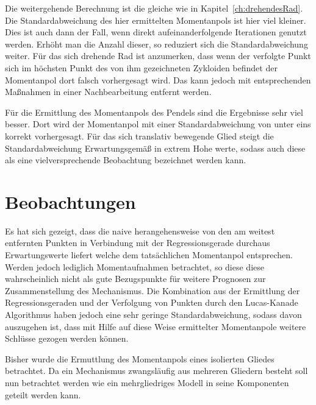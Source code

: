 Die weitergehende Berechnung ist die gleiche wie in Kapitel~\ref{ch:drehendesRad}.
Die Standardabweichung des hier ermittelten Momentanpols ist hier viel kleiner.
Dies ist auch dann der Fall, wenn direkt aufeinanderfolgende Iterationen genutzt werden.
Erhöht man die Anzahl dieser, so reduziert sich die Standardabweichung weiter.
Für das sich drehende Rad ist anzumerken, dass wenn der verfolgte Punkt sich im höchsten Punkt des von ihm gezeichneten Zykloiden befindet der Momentanpol dort falsch vorhergesagt wird.
Das kann jedoch mit entsprechenden Maßnahmen in einer Nachbearbeitung entfernt werden.

Für die Ermittlung des Momentanpols des Pendels sind die Ergebnisse sehr viel besser.
Dort wird der Momentanpol mit einer Standardabweichung von unter eins korrekt vorhergesagt.
Für das sich translativ bewegende Glied steigt die Standardabweichung Erwartungsgemäß in extrem Hohe werte, sodass auch diese als eine vielversprechende Beobachtung bezeichnet werden kann.


\section{Beobachtungen}
Es hat sich gezeigt, dass die naive herangehensweise von den am weitest entfernten Punkten in Verbindung mit der Regressionsgerade durchaus Erwartungswerte liefert welche dem tatsächlichen Momentanpol entsprechen.
Werden jedoch lediglich Momentaufnahmen betrachtet, so diese diese wahrscheinlich nicht als gute Bezugspunkte für weitere Prognosen zur Zusammenstellung des Mechanismus.
Die Kombination aus der Ermittlung der Regressionsgeraden und der Verfolgung von Punkten durch den Lucas-Kanade Algorithmus haben jedoch eine sehr geringe Standardabweichung, sodass davon auszugehen ist, dass mit Hilfe auf diese Weise ermittelter Momentanpole weitere Schlüsse gezogen werden können.

Bisher wurde die Ermuttlung des Momentanpols eines isolierten Gliedes betrachtet.
Da ein Mechanismus zwangsläufig aus mehreren Gliedern besteht soll nun betrachtet werden wie ein mehrgliedriges Modell in seine Komponenten geteilt werden kann.
